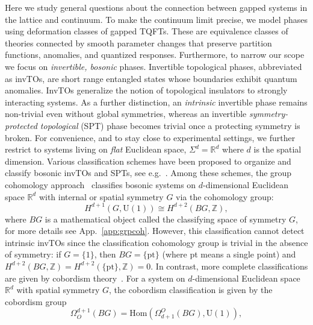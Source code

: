 \documentclass[aps,prx,reprint,superscriptaddress,twocolumn,amsmath,amssymb,amsfonts, nofootinbib]{revtex4-2}
\newcommand{\U}{\text{U}}
\theoremstyle{apsstyle}
\begin{document}
Here we study general questions about the connection between gapped systems in the lattice and continuum. To make the continuum limit precise, we model phases using deformation classes of gapped TQFTs. These are equivalence classes of theories connected by smooth parameter changes that preserve partition functions, anomalies, and quantized responses. Furthermore, to narrow our scope we focus on \emph{invertible, bosonic} phases. Invertible topological phases, abbreviated as invTOs, are short range entangled states whose boundaries exhibit quantum anomalies. InvTOs generalize the notion of topological insulators to strongly interacting systems. As a further distinction, an \emph{intrinsic} invertible phase remains non-trivial even without global symmetries, whereas an invertible \emph{symmetry-protected topological} (SPT) phase becomes trivial once a protecting symmetry is broken. For convenience, and to stay close to experimental settings, we further restrict to systems living on \emph{flat} Euclidean space, $\Sigma^{d}=\mathbb{R}^d$ where $d$ is the spatial dimension. 
Various classification schemes have been proposed to organize and classify bosonic invTOs and SPTs, see e.g.~\cite{Chen2013, ChenScience, Kapustin2014, Kapustin2015, GuXGW2014, Freed2014, Freed2021, WangGu2018, Huang2017}. 
Among these schemes, the group cohomology approach~\cite{Chen2013, ChenScience} classifies bosonic systems on $d$-dimensional  Euclidean space $\mathbb{R}^{d}$ with internal or spatial\cite{ThorngrenElse} symmetry $G$ via the cohomology group:
\begin{equation}
    H^{d+1}(G, \U(1)) \cong H^{d+2}(BG, \mathbb{Z}),
    \label{eq:grpcohclass}
\end{equation}
\noindent where $BG$ is a mathematical object called the classifying space of symmetry $G$, for more details see App.~\ref{app:grpcoh}. However, this classification cannot detect intrinsic invTOs since the classification cohomology group is trivial in the absence of symmetry: if $G=\{1\}$, then $BG=\{\mathrm{pt}\}$ (where pt means a single point) and $H^{d+2}(BG,\mathbb{Z})=H^{d+2}(\{\mathrm{pt}\},\mathbb{Z})=0$.  
In contrast, more complete classifications are given by cobordism theory~\cite{Kapustin2014, Kapustin2015, Freed2014, Freed2021}.  
For a system on $d$-dimensional  Euclidean space $\mathbb{R}^{d}$ with spatial symmetry $G$, the cobordism classification is given by the cobordism group 
\begin{equation}
    \Omega_{O}^{d+1}(BG) = \mathrm{Hom}(\Omega^{O}_{d+1}(BG), \U(1)),
    \label{eq:cobclass}
\end{equation}
\end{document}
